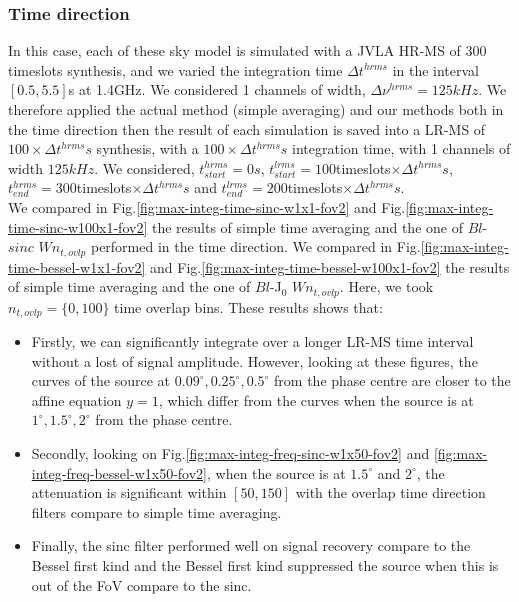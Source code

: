 \documentclass[useAMS,usenatbib]{mn2e}
\begin{document}
\subsubsection{Time direction}
In this case, each of these sky model is simulated with a JVLA HR-MS of $300$ timeslots synthesis, and we varied the integration time 
$\Delta t^{hrms}$ in the interval $[0.5,5.5]$s at 1.4GHz. We considered 1 channels of width, $\Delta \nu^{hrms}=125kHz$.   We 
therefore applied the actual method (simple averaging) and our methods both in the time direction then the result of each simulation is 
saved into a LR-MS of $100\times\Delta t^{hrms}s$ synthesis, with a $100\times\Delta t^{hrms}s$ integration time, with 1 channels of width 
$125kHz$. We considered, $t^{hrms}_{start}=0s$, $t^{lrms}_{start}=100$timeslots$\times\Delta t^{hrms} s$, 
$t^{hrms}_{end}=300$timeslots$\times\Delta t^{hrms}s$ and $t^{lrms}_{end}=200$timeslots$\times\Delta t^{hrms}s$.\\
We compared in Fig.\ref{fig:max-integ-time-sinc-w1x1-fov2} and Fig.\ref{fig:max-integ-time-sinc-w100x1-fov2}  the results of simple 
time averaging and the one of  $Bl$-$sinc$ $W n_{t,ovlp}$ performed in the time direction. We compared in 
Fig.\ref{fig:max-integ-time-bessel-w1x1-fov2} and Fig.\ref{fig:max-integ-time-bessel-w100x1-fov2} the results of simple time averaging 
and the one of  $Bl$-J$_0$ $W n_{t,ovlp}$. Here, we took $n_{t,ovlp}=\{0,100\}$ time overlap bins. These results 
shows that:
\begin{itemize}
 \item Firstly, we can significantly integrate over a longer LR-MS time interval without a lost of signal 
amplitude. However, looking at these figures, the curves of the source at $0.09^{\circ},0.25^{\circ},0.5^{\circ}$ from the phase centre are 
closer to the affine equation $y=1$, which differ from the curves when the source is at $1^{\circ},1.5^{\circ}, 2^{\circ}$ from the phase 
centre.  
 \item Secondly, looking on Fig.\ref{fig:max-integ-freq-sinc-w1x50-fov2} and 
\ref{fig:max-integ-freq-bessel-w1x50-fov2}, when the source is at $1.5^{\circ}$ and $2^{\circ}$, the attenuation is significant within 
$[50,150]$ with the overlap time direction filters compare to simple time averaging.
 \item Finally, the sinc filter performed well on signal recovery compare to the Bessel first kind and the Bessel first kind suppressed the 
source when this is out of the FoV compare to the sinc.  
\end{itemize}
\vspace{-0.5cm}
\end{document}
